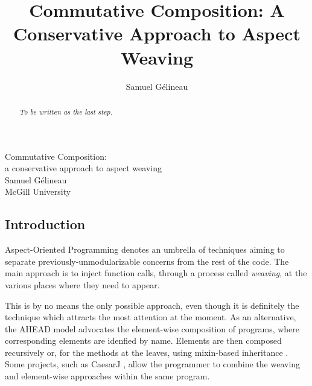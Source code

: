 \documentclass{article}
\title{Commutative Composition: A Conservative Approach to Aspect Weaving}
\author{Samuel G\'elineau}
\begin{document}
\begin{center}
{\larger[3] Commutative Composition:}\\
{\larger[2] a conservative approach to aspect weaving}\\
\vspace{\bigskipamount}
{\larger Samuel G\'elineau}\\
McGill University
\end{center}

\begin{abstract}\em
To be written as the last step.
\end{abstract}

\begin{multicols}{2}
\section{Introduction}\label{intro}
\vspace{-\parskip}\hspace*{\parindent}
Aspect-Oriented Programming denotes an umbrella of techniques aiming to separate previously-unmodularizable concerns from the rest of the code. The main approach is to inject function calls, through a process called \emph{weaving}, at the various places where they need to appear.

This is by no means the only possible approach, even though it is definitely the technique which attracts the most attention at the moment. As an alternative, the AHEAD model \cite{AHEAD} advocates the element-wise composition of programs, where corresponding elements are idenfied by name. Elements are then composed recursively or, for the methods at the leaves, using mixin-based inheritance \cite{mixin}. Some projects, such as CaesarJ \cite{CaesarJ}, allow the programmer to combine the weaving and element-wise approaches within the same program.




\end{multicols}
\end{document}
